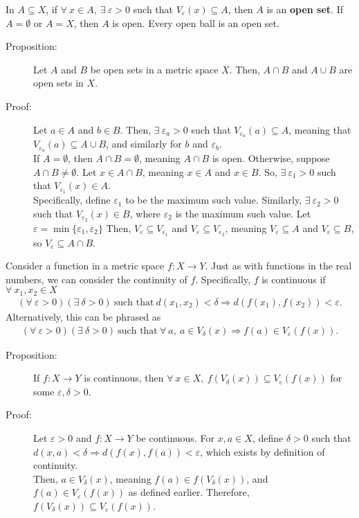 \documentclass[12pt]{extarticle}
\begin{document}
  In $A\subseteq X$, if $\forall~x\in A,~\exists~\varepsilon > 0$ such that $V_{\varepsilon}(x)\subseteq A$, then $A$ is an \textbf{open set}. If $A = \emptyset$ or $A = X$, then $A$ is open. Every open ball is an open set.
  \begin{description}
    \item[Proposition:] Let $A$ and $B$ be open sets in a metric space $X$. Then, $A\cap B$ and $A\cup B$ are open sets in $X$.
    \item[Proof:] Let $a\in A$ and $b\in B$. Then, $\exists~\varepsilon_a>0$ such that $V_{\varepsilon_a}(a)\subseteq A$, meaning that $V_{\varepsilon_a}(a)\subseteq A\cup B$, and similarly for $b$ and $\varepsilon_b$.\\

    If $A = \emptyset$, then $A\cap B = \emptyset$, meaning $A\cap B$ is open. Otherwise, suppose $A\cap B \neq \emptyset$. Let $x\in A\cap B$, meaning $x\in A$ and $x\in B$. So, $\exists~\varepsilon_1>0$ such that $V_{\varepsilon_1}(x)\in A$.\\

    Specifically, define $\varepsilon_1$ to be the maximum such value. Similarly, $\exists~\varepsilon_2 > 0$ such that $V_{\varepsilon_2}(x)\in B$, where $\varepsilon_2$ is the maximum such value. Let $\varepsilon = \min\{\varepsilon_1,\varepsilon_2\}$ Then, $V_{\varepsilon} \subseteq V_{\varepsilon_1}$ and $V_{\varepsilon} \subseteq V_{\varepsilon_2}$, meaning $V_{\varepsilon} \subseteq A$ and $V_{\varepsilon}\subseteq B$, so $V_{\varepsilon} \subseteq A\cap B$.
  \end{description}
  Consider a function in a metric space $f: X\rightarrow Y$. Just as with functions in the real numbers, we can consider the continuity of $f$.\supercite{lay} Specifically, $f$ is continuous if $\forall~x_1,x_2\in X$
  \begin{align*}
    \left(\forall~\varepsilon > 0\right)\left(\exists~\delta > 0\right)~\text{such that}~d(x_1,x_2) < \delta \Rightarrow d(f(x_1),f(x_2))<\varepsilon.
  \end{align*}
  Alternatively, this can be phrased as
  \begin{align*}
    \left(\forall~\varepsilon > 0\right)\left(\exists~\delta > 0\right)~\text{such that}~\forall~a,~a\in V_{\delta}(x) \Rightarrow f(a)\in V_{\varepsilon}(f(x)).
  \end{align*}
  \begin{description}
    \item[Proposition:] If $f:X\rightarrow Y$ is continuous, then $\forall~x\in X,~f(V_{\delta}(x)) \subseteq V_{\varepsilon}(f(x))$ for some $\varepsilon,\delta > 0$.
    \item[Proof:] Let $\varepsilon > 0$ and $f: X\rightarrow Y$ be continuous. For $x,a\in X$, define $\delta > 0$ such that $d(x,a) < \delta \Rightarrow d(f(x),f(a)) < \varepsilon$, which exists by definition of continuity.\\

      Then, $a\in V_{\delta}(x)$, meaning $f(a)\in f(V_{\delta}(x))$, and $f(a)\in V_{\varepsilon}(f(x))$ as defined earlier. Therefore, $f(V_{\delta}(x))\subseteq V_{\varepsilon}(f(x))$.
  \end{description}
\end{document}
